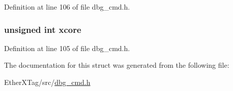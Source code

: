 Definition at line 106 of file dbg\-\_\-cmd.\-h.

\hypertarget{structdbg__cmd__type__disable__thread_a78357326dd562d441c3c73f5676ac638}{
\subsubsection[{xcore}]{\setlength{\rightskip}{0pt plus 5cm}unsigned int xcore}}\label{structdbg__cmd__type__disable__thread_a78357326dd562d441c3c73f5676ac638}


Definition at line 105 of file dbg\-\_\-cmd.\-h.



The documentation for this struct was generated from the following file\-:\begin{DoxyCompactItemize}
\item 
Ether\-X\-Tag/src/\hyperlink{dbg__cmd_8h}{dbg\-\_\-cmd.\-h}\end{DoxyCompactItemize}
